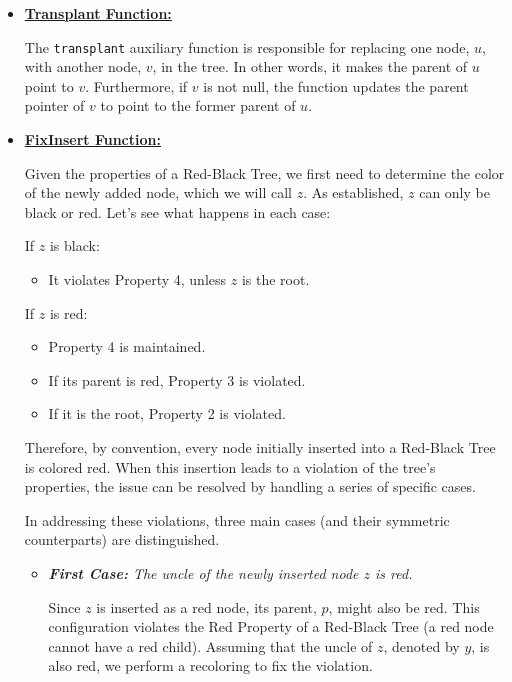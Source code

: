 \begin{itemize}
    \item \underline{\textbf{Transplant Function:}}

    The \texttt{transplant} auxiliary function is responsible for replacing one node, $u$, with another node, $v$, in the tree. In other words, it makes the parent of $u$ point to $v$. Furthermore, if $v$ is not null, the function updates the parent pointer of $v$ to point to the former parent of $u$.

    \item \underline{\textbf{FixInsert Function:}}
    
    Given the properties of a Red-Black Tree, we first need to determine the color of the newly added node, which we will call $z$. As established, $z$ can only be black or red. Let's see what happens in each case:
    
    If $z$ is black: 
    \begin{itemize}
        \item It violates Property 4, unless $z$ is the root.
    \end{itemize}
    
    If $z$ is red:
    \begin{itemize}
        \item Property 4 is maintained.
        \item If its parent is red, Property 3 is violated.
        \item If it is the root, Property 2 is violated.
    \end{itemize}
    
    Therefore, by convention, every node initially inserted into a Red-Black Tree is colored red. When this insertion leads to a violation of the tree's properties, the issue can be resolved by handling a series of specific cases.
    
    In addressing these violations, three main cases (and their symmetric counterparts) are distinguished.
    \begin{itemize}
    \item \textit{\textbf{First Case:} The uncle of the newly inserted node $z$ is red.}

    Since $z$ is inserted as a red node, its parent, $p$, might also be red. This configuration violates the Red Property of a Red-Black Tree (a red node cannot have a red child). Assuming that the uncle of $z$, denoted by $y$, is also red, we perform a recoloring to fix the violation.


\end{itemize}
\end{itemize}
